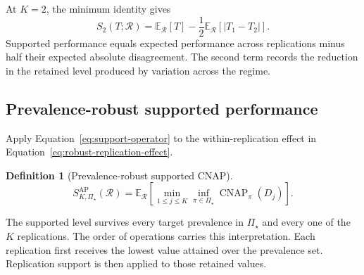 \documentclass[11pt]{article}
\newcommand{\CNAP}{\operatorname{CNAP}}
\newcommand{\Regime}{\mathcal{R}}
\newcommand{\PSet}{\Pi_\star}
\newcommand{\E}{\mathbb{E}}
\newcommand{\SRob}{S_{K,\PSet}^{\mathrm{AP}}(\Regime)}
\newtheorem{definition}{Definition}
\theoremstyle{remark}
\begin{document}
At $K=2$, the minimum identity gives
\begin{equation}
S_2(T;\Regime)
=
\E_{\Regime}[T]
-
\frac12
\E_{\Regime}
\left[
|T_1-T_2|
\right].
\label{eq:k2-decomposition}
\end{equation}
Supported performance equals expected performance across replications minus half their expected absolute disagreement. The second term records the reduction in the retained level produced by variation across the regime.

\subsection{Prevalence-robust supported performance}

Apply Equation~\eqref{eq:support-operator} to the within-replication effect in Equation~\eqref{eq:robust-replication-effect}.

\begin{definition}[Prevalence-robust supported CNAP]
\begin{equation}
\SRob
=
\E_{\Regime}
\left[
\min_{1\leq j\leq K}
\inf_{\pi\in\PSet}
\CNAP_\pi(D_j)
\right].
\label{eq:robust-support}
\end{equation}
\end{definition}

The supported level survives every target prevalence in $\PSet$ and every one of the $K$ replications. The order of operations carries this interpretation. Each replication first receives the lowest value attained over the prevalence set. Replication support is then applied to those retained values.
\end{document}
